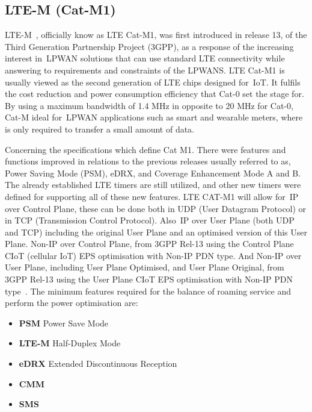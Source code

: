 \newpage
\subsection{LTE-M (Cat-M1)} %
\label{sec:catm1_sota}


LTE-M~\cite{LTE-M}, officially know as LTE Cat-M1, was first introduced in release 13, of the Third Generation Partnership Project (3GPP), as a response of the increasing interest in~\gls{LPWAN} solutions that can use standard LTE connectivity while answering to requirements and constraints  of the LPWANS.
LTE Cat-M1 is usually  viewed as the second generation of LTE chips designed for~\gls{IoT}. It fulfils  the cost reduction and power consumption efficiency  that Cat-0 set the stage for. 
By using a  maximum bandwidth of 1.4 MHz in opposite to 20 MHz for Cat-0, Cat-M ideal for~\gls{LPWAN} applications such as  smart and wearable meters, where is only required to transfer a small amount of data.

Concerning the specifications  which define Cat M1. There were features and functions improved in relations to the previous releases usually referred to as, Power Saving Mode (PSM), eDRX, and  Coverage Enhancement Mode A and B. The already established LTE timers are still utilized, and other new timers were defined for supporting all of these new features.
LTE CAT-M1 will allow for~\gls{IP} over Control Plane, these can be done  both in UDP (User Datagram Protocol) or in  TCP (Transmission Control Protocol).
Also~\gls{IP} over User Plane (both UDP and TCP) including the original User Plane and an optimised version of this User Plane.
Non-IP over Control Plane, from 3GPP Rel-13 using the Control Plane CIoT (cellular IoT) EPS optimisation with Non-IP PDN type. 
And Non-IP over User Plane, including User Plane Optimised, and User Plane Original, from 3GPP Rel-13 using the User Plane CIoT EPS optimisation with Non-IP PDN type~\cite{LTE-M}. 
The  minimum features required for the balance of roaming service  and perform the power optimisation are:
\begin{itemize}
	\item \textbf{PSM } Power Save Mode
	\item \textbf{LTE-M} Half-Duplex Mode
	\item \textbf{eDRX } Extended Discontinuous Reception
	\item \textbf{CMM } 
	\item \textbf{SMS} 
\end{itemize} 

